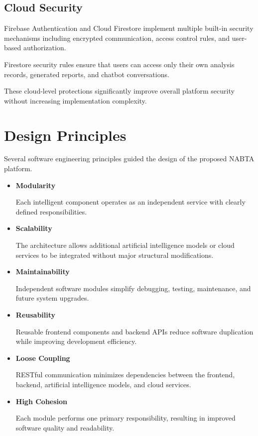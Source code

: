 \subsection{Cloud Security}

Firebase Authentication and Cloud Firestore implement multiple built-in security mechanisms including encrypted communication, access control rules, and user-based authorization.

Firestore security rules ensure that users can access only their own analysis records, generated reports, and chatbot conversations.

These cloud-level protections significantly improve overall platform security without increasing implementation complexity.

\section{Design Principles}
\label{sec:design_principles}

Several software engineering principles guided the design of the proposed NABTA platform.

\begin{itemize}

\item \textbf{Modularity}

Each intelligent component operates as an independent service with clearly defined responsibilities.

\item \textbf{Scalability}

The architecture allows additional artificial intelligence models or cloud services to be integrated without major structural modifications.

\item \textbf{Maintainability}

Independent software modules simplify debugging, testing, maintenance, and future system upgrades.

\item \textbf{Reusability}

Reusable frontend components and backend APIs reduce software duplication while improving development efficiency.

\item \textbf{Loose Coupling}

RESTful communication minimizes dependencies between the frontend, backend, artificial intelligence models, and cloud services.

\item \textbf{High Cohesion}

Each module performs one primary responsibility, resulting in improved software quality and readability.

\end{itemize}

